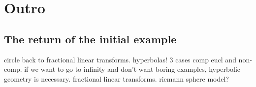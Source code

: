 \documentclass[
]{article}
\begin{document}
\hypertarget{outro}{%
\section{Outro}\label{outro}}


\hypertarget{return-of-the-initial-example}{%
\subsection{The return of the initial example
}\label{return-of-the-initial-example}}

circle back to fractional linear transforms.
hyperbolas! 3 cases comp eucl and non-comp. if we want to go to infinity
and don't want boring examples, hyperbolic geometry is necessary.
fractional linear transforms. riemann sphere model?




\cleardoublepage
{}
{}

\printbibliography
\end{document}
